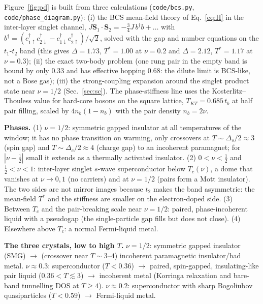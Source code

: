\documentclass[11pt]{article}
\newcommand{\nuh}{\nu=1/2}
\newcommand{\nut}{\nu\approx0.3}
\newcommand{\nutw}{\nu\approx0.2}
\begin{document}
Figure~\ref{fig:pd} is built from three calculations (\texttt{code/bcs.py}, \texttt{code/phase\_diagram.py}): (i) the BCS mean-field theory of Eq.~\eqref{eq:H} in the inter-layer singlet channel, $J\mathbf S_1\!\cdot\!\mathbf S_2=-\tfrac34J\,b^\dagger b+\dots$ with $b^\dagger=(c^\dagger_{1\uparrow}c^\dagger_{2\downarrow}-c^\dagger_{1\downarrow}c^\dagger_{2\uparrow})/\sqrt2$, solved with the gap and number equations on the $t_1$-$t_2$ band (this gives $\Delta=1.73$, $T^*=1.00$ at $\nu=0.2$ and $\Delta=2.12$, $T^*=1.17$ at $\nu=0.3$); (ii) the exact two-body problem (one rung pair in the empty band is bound by only $0.33$ and has effective hopping $0.68$: the dilute limit is BCS-like, not a Bose gas); (iii) the strong-coupling expansion around the singlet product state near $\nuh$ (Sec.~\ref{sec:sc}). The phase-stiffness line uses the Kosterlitz--Thouless value for hard-core bosons on the square lattice, $T_{KT}=0.685\,t_b$ at half pair filling, scaled by $4n_b(1-n_b)$ with the pair density $n_b=2\nu$.

\textbf{Phases.} (1) $\nuh$: symmetric gapped insulator at all temperatures of the window; it has no phase transition on warming, only crossovers at $T\sim\Delta_s/2\approx3$ (spin gap) and $T\sim\Delta_c/2\approx4$ (charge gap) to an incoherent paramagnet; for $|\nu-\tfrac12|$ small it extends as a thermally activated insulator. (2) $0<\nu<\tfrac12$ and $\tfrac12<\nu<1$: inter-layer singlet $s$-wave superconductor below $T_c(\nu)$, a dome that vanishes at $\nu\to0,1$ (no carriers) and at $\nuh$ (pairs form a Mott insulator). The two sides are not mirror images because $t_2$ makes the band asymmetric: the mean-field $T^*$ and the stiffness are smaller on the electron-doped side. (3) Between $T_c$ and the pair-breaking scale near $\nuh$: paired, phase-incoherent liquid with a pseudogap (the single-particle gap fills but does not close). (4) Elsewhere above $T_c$: a normal Fermi-liquid metal.

\textbf{The three crystals, low to high $T$.} $\nuh$: symmetric gapped insulator (SMG) $\to$ (crossover near $T\sim3$--$4$) incoherent paramagnetic insulator/bad metal. $\nut$: superconductor ($T<0.36$) $\to$ paired, spin-gapped, insulating-like pair liquid ($0.36<T\lesssim3$) $\to$ incoherent metal (Korringa relaxation and bare-band tunnelling DOS at $T\ge4$). $\nutw$: superconductor with sharp Bogoliubov quasiparticles ($T<0.59$) $\to$ Fermi-liquid metal.
\end{document}
